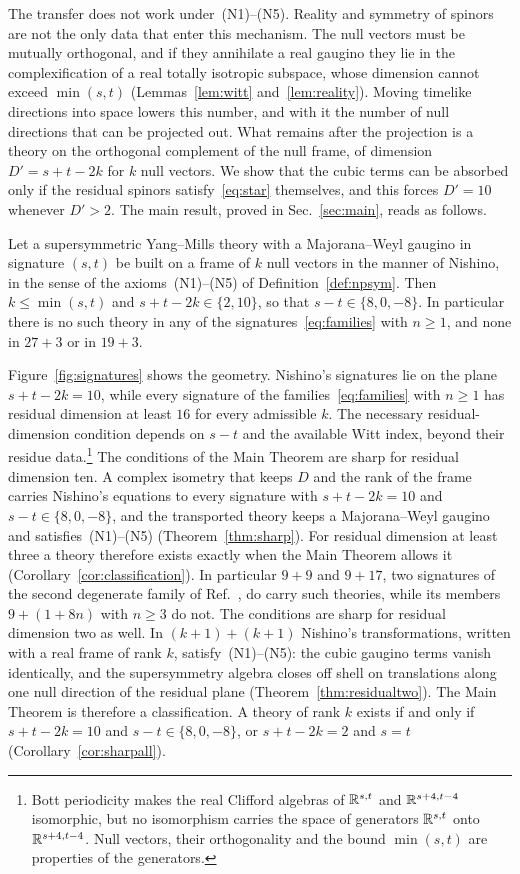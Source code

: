 The transfer does not work under~(N1)--(N5). Reality and symmetry of spinors are not the only data that enter this mechanism. The null vectors must be mutually orthogonal, and if they annihilate a real gaugino they lie in the complexification of a real totally isotropic subspace, whose dimension cannot exceed $\min(s,t)$ (Lemmas~\ref{lem:witt} and~\ref{lem:reality}). Moving timelike directions into space lowers this number, and with it the number of null directions that can be projected out. What remains after the projection is a theory on the orthogonal complement of the null frame, of dimension $D'=s+t-2k$ for $k$ null vectors. We show that the cubic terms can be absorbed only if the residual spinors satisfy~\eqref{eq:star} themselves, and this forces $D'=10$ whenever $D'>2$. The main result, proved in Sec.~\ref{sec:main}, reads as follows.

\begin{maintheorem}
Let a supersymmetric Yang--Mills theory with a Majorana--Weyl gaugino in signature $(s,t)$ be built on a frame of $k$ null vectors in the manner of Nishino, in the sense of the axioms~(N1)--(N5) of Definition~\ref{def:npsym}. Then $k\le\min(s,t)$ and $s+t-2k\in\{2,10\}$, so that $s-t\in\{8,0,-8\}$. In particular there is no such theory in any of the signatures~\eqref{eq:families} with $n\ge1$, and none in $27+3$ or in $19+3$.
\end{maintheorem}

Figure~\ref{fig:signatures} shows the geometry. Nishino's signatures lie on the plane $s+t-2k=10$, while every signature of the families~\eqref{eq:families} with $n\ge1$ has residual dimension at least $16$ for every admissible $k$. The necessary residual-dimension condition depends on $s-t$ and the available Witt index, beyond their residue data.\footnote{Bott periodicity makes the real Clifford algebras of $\mathbb{R}^{s,t}$ and $\mathbb{R}^{s+4,t-4}$ isomorphic, but no isomorphism carries the space of generators $\mathbb{R}^{s,t}$ onto $\mathbb{R}^{s+4,t-4}$. Null vectors, their orthogonality and the bound $\min(s,t)$ are properties of the generators.}
The conditions of the Main Theorem are sharp for residual dimension ten. A complex isometry that keeps $D$ and the rank of the frame carries Nishino's equations to every signature with $s+t-2k=10$ and $s-t\in\{8,0,-8\}$, and the transported theory keeps a Majorana--Weyl gaugino and satisfies~(N1)--(N5) (Theorem~\ref{thm:sharp}). For residual dimension at least three a theory therefore exists exactly when the Main Theorem allows it (Corollary~\ref{cor:classification}). In particular $9+9$ and $9+17$, two signatures of the second degenerate family of Ref.~\cite{RiosMarraniChester2019}, do carry such theories, while its members $9+(1+8n)$ with $n\ge3$ do not.
The conditions are sharp for residual dimension two as well. In $(k+1)+(k+1)$ Nishino's transformations, written with a real frame of rank $k$, satisfy~(N1)--(N5): the cubic gaugino terms vanish identically, and the supersymmetry algebra closes off shell on translations along one null direction of the residual plane (Theorem~\ref{thm:residualtwo}). The Main Theorem is therefore a classification. A theory of rank $k$ exists if and only if $s+t-2k=10$ and $s-t\in\{8,0,-8\}$, or $s+t-2k=2$ and $s=t$ (Corollary~\ref{cor:sharpall}).

